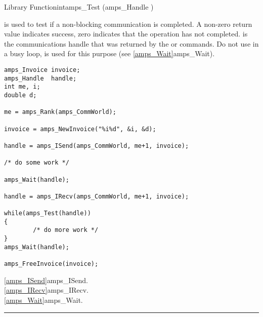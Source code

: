\begin{deftypefn}{Library Function}{int}{amps\_Test}
(amps_Handle )

\DESCRIPTION

 is used to test if a non-blocking communication is
completed.  A non-zero return value indicates success, zero indicates
that the operation has not completed.   is the
communications handle that was returned by the  or
 commands.  Do not use  in a busy
loop,  is used for this purpose (see
\vref{amps_Wait}{amps\_Wait}).

\EXAMPLE

\begin{display}\begin{verbatim}
amps_Invoice invoice;
amps_Handle  handle;
int me, i;
double d;

me = amps_Rank(amps_CommWorld);

invoice = amps_NewInvoice("%i%d", &i, &d);

handle = amps_ISend(amps_CommWorld, me+1, invoice);

/* do some work */

amps_Wait(handle);

handle = amps_IRecv(amps_CommWorld, me+1, invoice);

while(amps_Test(handle))
{
        /* do more work */
}
amps_Wait(handle);

amps_FreeInvoice(invoice);
\end{verbatim}\end{display}

\SEEALSO
\vref{amps_ISend}{amps\_ISend}. \\
\vref{amps_IRecv}{amps\_IRecv}. \\
\vref{amps_Wait}{amps\_Wait}. \\

\end{deftypefn}


\noindent\rule{\textwidth}{1mm}

